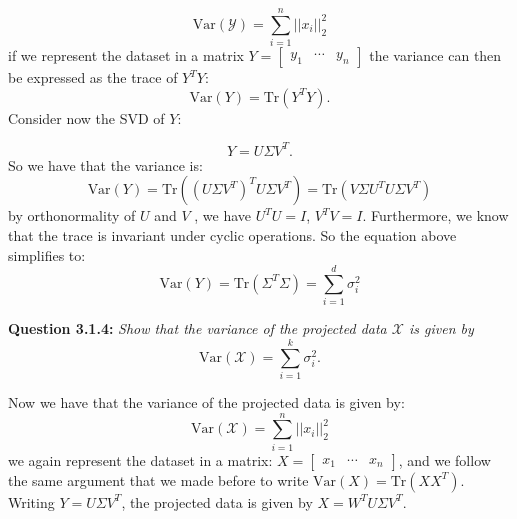 \documentclass{article}
\begin{document}
\begin{multicols}{2}
    \begin{equation*}
        \text{Var}(\mathcal{Y})= \sum_{i=1}^{n}||x_i||_2^2
    \end{equation*}
    if we represent the dataset in a matrix $Y = \begin{bmatrix}
        y_1 & \cdots & y_n
    \end{bmatrix}$ the variance can then be expressed as the trace of $Y^TY$:
    \begin{equation*}
        \text{Var}(Y) =\text{Tr}(Y^TY).
    \end{equation*}
    Consider now the SVD of $Y$:

    \begin{equation*}
        Y = U \Sigma V^T.
    \end{equation*}
    So we have that the variance is:
    \begin{equation*}
        \text{Var}(Y) =\text{Tr}((U \Sigma V^T)^TU \Sigma V^T) = \text{Tr}(V \Sigma U^T U \Sigma V^T)
    \end{equation*}
    by orthonormality of $U$ and $V$ , we have $U^TU=I$, $V^TV=I$. Furthermore, we know that the trace is invariant under cyclic 
    operations. So the equation above simplifies to:
    \begin{equation*}
        \text{Var}(Y) = \text{Tr}(\Sigma^T \Sigma) = \sum_{i=1}^{d} \sigma_i^2
    \end{equation*} 
    \vspace{0.5cm}

    \noindent \textbf{Question 3.1.4:}  
    \textit{Show that the variance of the projected data \( \mathcal{X} \) is given by}  
    \[
    \text{Var}(\mathcal{X}) = \sum_{i=1}^k \sigma_i^2.
    \]

    \vspace{0.5cm}
    Now we have that the variance of the projected data is given by:
    \begin{equation*}
        \text{Var}(\mathcal{X}) = \sum_{i=1}^{n}||x_i||_2^2
    \end{equation*}    
    we again represent the dataset in a matrix:
    \(X = \begin{bmatrix}
         x_1 & \cdots & x_n 
        \end{bmatrix}\), and we follow the same argument that we made before to write  $\text{Var}(X)=\text{Tr}(XX^T)$.
    Writing $Y = U \Sigma V^T$, the projected data is given by $X = W^T U \Sigma V^T$.


\end{multicols}
\end{document}
